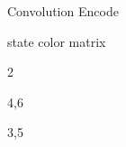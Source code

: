 \begin{frame}{Convolution Encode}
\begin{center}
\begin{minipage}{.45\textwidth}
\begin{center}
\begin{tikzpicture}[scale=.70, >=stealth, font=\tiny]
\end{tikzpicture}
\end{center}
\end{minipage}
\end{center}

\end{frame}

\begin{frame}{state color matrix}

2

4,6

3,5

\end{frame}
